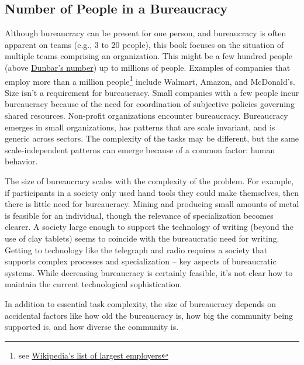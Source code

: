 \subsection{Number of People in a Bureaucracy}

Although bureaucracy can be present for one person, and bureaucracy is often apparent on teams (e.g., 3 to 20 people), this book focuses on the situation of multiple teams comprising an organization. This might be a few hundred people (above \href{https://en.wikipedia.org/wiki/Dunbar's_number}{Dunbar's number}) up to millions of people. 
Examples of companies that employ more than a million people\footnote{see \href{https://en.wikipedia.org/wiki/List_of_largest_employers}{Wikipedia's list of largest employers}} include Walmart, Amazon, and McDonald's. Size isn't a requirement for bureaucracy. Small companies with a few people incur bureaucracy because of the need for coordination of subjective policies governing shared resources. Non-profit organizations encounter bureaucracy. 
Bureaucracy emerges in small organizations, has patterns that are scale invariant, and is generic across sectors. The complexity of the tasks may be different, but the same scale-independent patterns can emerge because of a common factor: human behavior.

The size of bureaucracy scales with the complexity of the problem. For example, if participants in a society only used hand tools they could make themselves, then there is little need for bureaucracy. Mining and producing small amounts of metal is feasible for an individual, though the relevance of specialization becomes clearer. A society large enough to support the technology of writing (beyond the use of clay tablets) seems to coincide with the bureaucratic need for writing. Getting to technology like the telegraph and radio requires a society that supports complex processes and specialization -- key aspects of bureaucratic systems. While decreasing bureaucracy is certainly feasible, it's not clear how to maintain the current technological sophistication. 


In addition to essential task complexity, the size of bureaucracy depends on accidental factors like how old the bureaucracy is, how big the community being supported is, and how diverse the community is.



